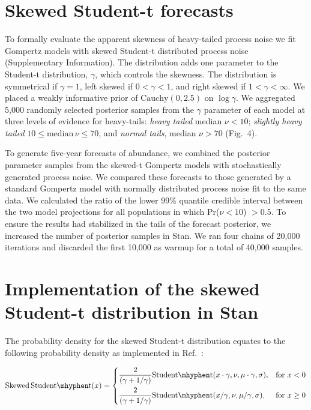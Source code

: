 \documentclass[12pt]{article}
\begin{document}
\section{Skewed Student-t forecasts} To formally evaluate the apparent skewness of heavy-tailed process noise we fit Gompertz models with skewed Student-t distributed process noise\cite{fernandez1998} (Supplementary Information). The distribution adds one parameter to the Student-t distribution, \(\gamma\), which controls the skewness. The distribution is symmetrical if \(\gamma = 1\), left skewed if \(0 < \gamma < 1\), and right skewed if \(1 < \gamma < \infty\). We placed a weakly informative prior of \(\mathrm{Cauchy}(0, 2.5)\) on \(\log \gamma\). We aggregated 5,000 randomly selected posterior samples from the \(\gamma\) parameter of each model at three levels of evidence for heavy-tails: \emph{heavy tailed} median \(\nu < 10\); \emph{slightly heavy tailed} \(10 \le \mathrm{median}\, \nu \le 70\), and \emph{normal tails}, median \(\nu > 70\) (Fig.~4).

To generate five-year forecasts of abundance, we combined the posterior parameter samples from the skewed-t Gompertz models with stochastically generated process noise. We compared these forecasts to those generated by a standard Gompertz model with normally distributed process noise fit to the same data. We calculated the ratio of the lower 99\% quantile credible interval between the two model projections for all populations in which Pr(\(\nu < 10\)) \(> 0.5\). To ensure the results had stabilized in the tails of the forecast posterior, we increased the number of posterior samples in Stan. We ran four chains of 20,000 iterations and discarded the first 10,000 as warmup for a total of 40,000 samples.

\section{Implementation of the skewed Student-t distribution in Stan}

The probability density for the skewed Student-t distribution \cite{fernandez1998} equates to the following probability density as implemented in Ref.~\cite{king2012}:

\begin{equation}
  \mathrm{Skewed\,Student\mhyphen t}(x) =
\begin{dcases}
\frac{2}{(\gamma + 1/\gamma)}
         \mathrm{Student\mhyphen t}(x \cdot \gamma, \nu, \mu \cdot \gamma, \sigma),& \text{for } x < 0\\
       \frac{2}{(\gamma + 1/\gamma)}
         \mathrm{Student\mhyphen t}(x / \gamma, \nu, \mu / \gamma, \sigma),& \text{for } x \ge 0
\end{dcases}
\end{equation}
\end{document}
